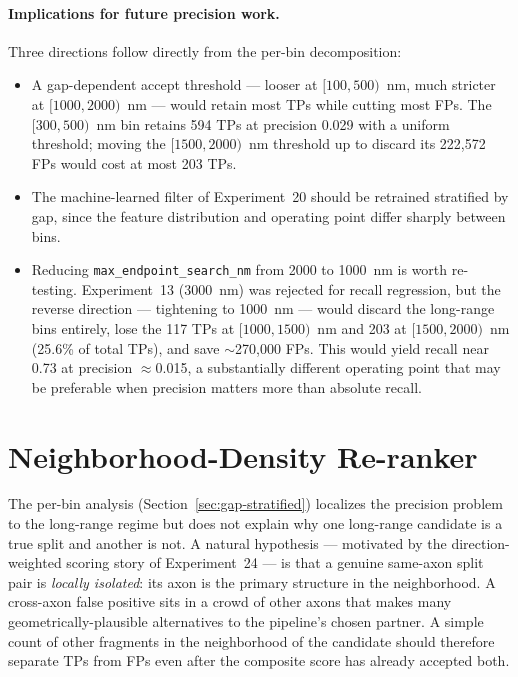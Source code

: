 \paragraph{Implications for future precision work.}
Three directions follow directly from the per-bin decomposition:

\begin{itemize}
  \item A gap-dependent accept threshold --- looser at $[100, 500)$~nm, much
        stricter at $[1000, 2000)$~nm --- would retain most TPs while cutting
        most FPs.  The $[300, 500)$~nm bin retains 594 TPs at precision 0.029
        with a uniform threshold; moving the $[1500, 2000)$~nm threshold up
        to discard its 222{,}572 FPs would cost at most 203 TPs.
  \item The machine-learned filter of Experiment~20 should be retrained
        stratified by gap, since the feature distribution and operating
        point differ sharply between bins.
  \item Reducing \texttt{max\_endpoint\_search\_nm} from 2000 to 1000~nm is
        worth re-testing.  Experiment~13 (3000~nm) was rejected for recall
        regression, but the reverse direction --- tightening to 1000~nm ---
        would discard the long-range bins entirely, lose the 117 TPs at
        $[1000, 1500)$~nm and 203 at $[1500, 2000)$~nm (25.6\% of total TPs),
        and save $\sim$270{,}000 FPs.  This would yield recall near 0.73
        at precision $\approx$0.015, a substantially different operating
        point that may be preferable when precision matters more than
        absolute recall.
\end{itemize}

\section{Neighborhood-Density Re-ranker}
\label{sec:density-reranker}

The per-bin analysis (Section~\ref{sec:gap-stratified}) localizes the
precision problem to the long-range regime but does not explain why one
long-range candidate is a true split and another is not.  A natural
hypothesis --- motivated by the direction-weighted scoring story of
Experiment~24 --- is that a genuine same-axon split pair is
\emph{locally isolated}: its axon is the primary structure in the
neighborhood.  A cross-axon false positive sits in a crowd of other axons
that makes many geometrically-plausible alternatives to the pipeline's
chosen partner.  A simple count of other fragments in the neighborhood
of the candidate should therefore separate TPs from FPs even after the
composite score has already accepted both.


